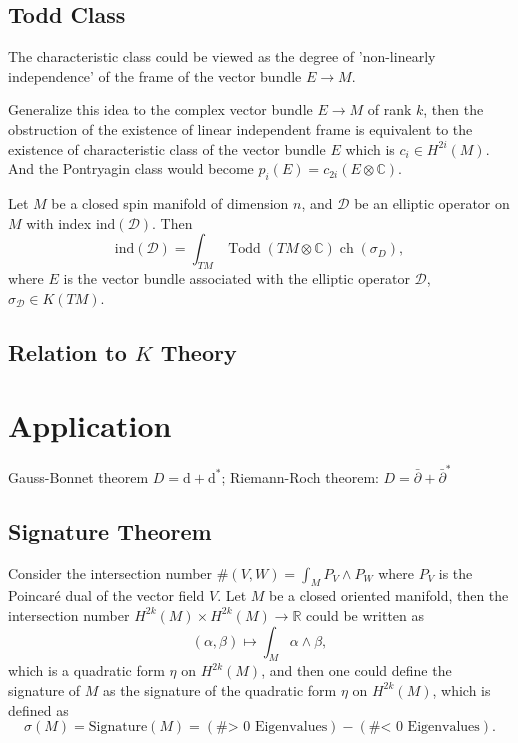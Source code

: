 \documentclass[10pt]{article}
\begin{document}
\subsection{Todd Class}

The characteristic class could be viewed as the degree of 'non-linearly independence' of the frame of the vector bundle $ E \rightarrow M$.

Generalize this idea to the complex vector bundle $ E \rightarrow M$ of rank $ k$, then the obstruction of the existence of linear independent frame is equivalent to the existence of characteristic class of the vector bundle $ E$ which is $ c_{i} \in H^{2i} (M)$.
And the Pontryagin class would become $ p_{i}(E) = c_{2i} (E \otimes \mathbb{C})$.

\begin{theorem}
  Let $ M$ be a closed spin manifold of dimension $ n$, and $ \mathcal{D}$ be an elliptic operator on $ M$ with index $ \mathrm{ind}(\mathcal{D})$. Then
  \begin{equation*}
    \mathrm{ind}(\mathcal{D}) = \int_{TM} \operatorname{Todd}(TM \otimes  \mathbb{C}) \operatorname{ch}(\sigma_{D}),
  \end{equation*}
  where $ E$ is the vector bundle associated with the elliptic operator $ \mathcal{D}$, $ \sigma_{\mathcal{D}} \in K(TM)$.
\end{theorem}

\subsection{\texorpdfstring{Relation to $K$ Theory}{ Relation to K Theory}}

\section{Application}

Gauss-Bonnet theorem $ D = \mathrm{d} + \mathrm{d} ^{*}$; Riemann-Roch theorem: $ D = \bar{\partial} + \bar{\partial}^{*}$

\subsection{Signature Theorem}

Consider the intersection number $\# (V,W) = \int _{M} P_{V}\wedge P_{W}$ where $ P_{V}$ is the Poincaré dual of the vector field $ V$. Let $ M$ be a closed oriented manifold, then the intersection number $ H^{2k}(M) \times H^{2k}(M) \rightarrow \mathbb{R}$ could be written as
\begin{equation*}
  \left( \alpha,\beta \right) \mapsto \int_{M} \alpha \wedge \beta,
\end{equation*}
which is a quadratic form $ \eta$ on $ H^{2k}(M)$, and then one could define the signature of $ M$ as the signature of the quadratic form $ \eta$ on $ H^{2k}(M)$, which is defined as
\begin{equation*}
  \sigma(M) = \text{Signature}(M) = \left( \text{\# > 0 Eigenvalues} \right) - \left( \text{\# < 0 Eigenvalues} \right).
\end{equation*}
\end{document}
